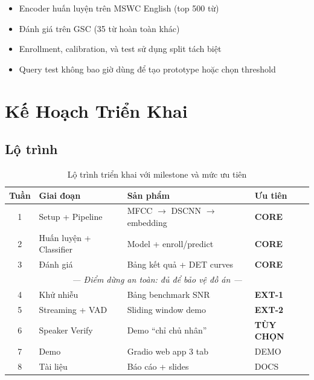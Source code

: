 \documentclass[12pt,a4paper]{report}
\begin{document}
\begin{itemize}
    \item Encoder huấn luyện trên MSWC English (top 500 từ)
    \item Đánh giá trên GSC (35 từ hoàn toàn khác)
    \item Enrollment, calibration, và test sử dụng split tách biệt
    \item Query test không bao giờ dùng để tạo prototype hoặc chọn threshold
\end{itemize}


\chapter{Kế Hoạch Triển Khai}

\section{Lộ trình}

\begin{table}[h]
\centering
\caption{Lộ trình triển khai với milestone và mức ưu tiên}
\begin{tabular}{clll}
\toprule
\textbf{Tuần} & \textbf{Giai đoạn} & \textbf{Sản phẩm} & \textbf{Ưu tiên} \\
\midrule
1 & Setup + Pipeline & MFCC $\to$ DSCNN $\to$ embedding &
    \textcolor{corecolor}{\textbf{CORE}} \\
2 & Huấn luyện + Classifier & Model + enroll/predict &
    \textcolor{corecolor}{\textbf{CORE}} \\
3 & Đánh giá & Bảng kết quả + DET curves &
    \textcolor{corecolor}{\textbf{CORE}} \\
\midrule
\multicolumn{4}{c}{\textit{--- Điểm dừng an toàn: đủ để bảo vệ đồ án ---}} \\
\midrule
4 & Khử nhiễu & Bảng benchmark SNR &
    \textcolor{ext1color}{\textbf{EXT-1}} \\
5 & Streaming + VAD & Sliding window demo &
    \textcolor{ext2color}{\textbf{EXT-2}} \\
6 & Speaker Verify & Demo ``chỉ chủ nhân'' &
    \textcolor{optcolor}{\textbf{TÙY CHỌN}} \\
7 & Demo & Gradio web app 3 tab &
    DEMO \\
8 & Tài liệu & Báo cáo + slides &
    DOCS \\
\bottomrule
\end{tabular}
\end{table}
\end{document}
